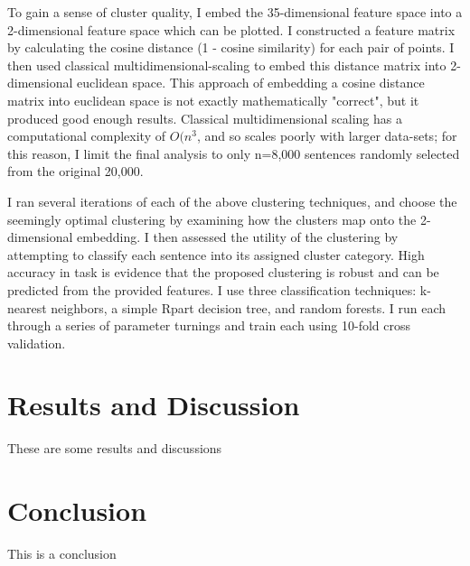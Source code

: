 \documentclass[
10pt, %
a4paper, %
oneside, %
headinclude,footinclude, %
BCOR5mm, %
]{scrartcl}
\begin{document}
To gain a sense of cluster quality, I embed the 35-dimensional feature space into a 2-dimensional feature space which can be plotted. I constructed a feature matrix by calculating the cosine distance (1 - cosine similarity) for each pair of points. I then used classical multidimensional-scaling to embed this distance matrix into 2-dimensional euclidean space. This approach of embedding a cosine distance matrix into euclidean space is not exactly mathematically "correct", but it produced good enough results. Classical multidimensional scaling has a computational complexity of $O(n^{3}$, and so scales poorly with larger data-sets; for this reason, I limit the final analysis to only n=8,000 sentences randomly selected from the original 20,000. 

I ran several iterations of each of the above clustering techniques, and choose the seemingly optimal clustering by examining how the clusters map onto the 2-dimensional embedding. I then assessed the utility of the clustering by attempting to classify each sentence into its assigned cluster category. High accuracy in task is evidence that the proposed clustering is robust and can be predicted from the provided features. I use three classification techniques: k-nearest neighbors, a simple Rpart decision tree, and random forests. I run each through a series of parameter turnings and train each using 10-fold cross validation. 



\section{Results and Discussion}

These are some results and discussions

\section{Conclusion}

This is a conclusion

\newpage
\renewcommand{\refname}{\spacedlowsmallcaps{References}} %





\end{document}
